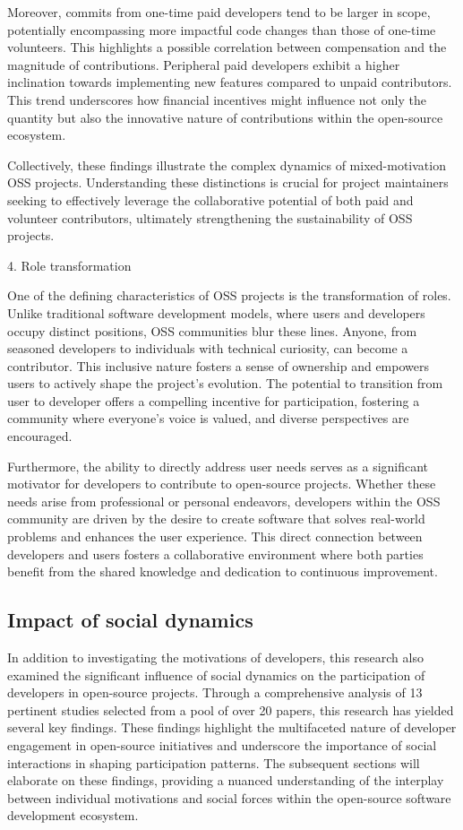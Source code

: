 Moreover, commits from one-time paid developers tend to be larger in scope, potentially encompassing more impactful code changes than those of one-time volunteers. This highlights a possible correlation between compensation and the magnitude of contributions. Peripheral paid developers exhibit a higher inclination towards implementing new features compared to unpaid contributors. This trend underscores how financial incentives might influence not only the quantity but also the innovative nature of contributions within the open-source ecosystem.

Collectively, these findings illustrate the complex dynamics of mixed-motivation OSS projects. Understanding these distinctions is crucial for project maintainers seeking to effectively leverage the collaborative potential of both paid and volunteer contributors, ultimately strengthening the sustainability of OSS projects.

4. Role transformation

One of the defining characteristics of OSS projects is the transformation of roles.  Unlike traditional software development models, where users and developers occupy distinct positions, OSS communities blur these lines.  Anyone, from seasoned developers to individuals with technical curiosity, can become a contributor.  This inclusive nature fosters a sense of ownership and empowers users to actively shape the project's evolution.  The potential to transition from user to developer offers a compelling incentive for participation, fostering a community where everyone's voice is valued, and diverse perspectives are encouraged.

Furthermore, the ability to directly address user needs serves as a significant motivator for developers to contribute to open-source projects.  Whether these needs arise from professional or personal endeavors, developers within the OSS community are driven by the desire to create software that solves real-world problems and enhances the user experience.  This direct connection between developers and users fosters a collaborative environment where both parties benefit from the shared knowledge and dedication to continuous improvement.

\subsection{Impact of social dynamics}

In addition to investigating the motivations of developers, this research also examined the significant influence of social dynamics on the participation of developers in open-source projects. Through a comprehensive analysis of 13 pertinent studies selected from a pool of over 20 papers, this research has yielded several key findings. These findings highlight the multifaceted nature of developer engagement in open-source initiatives and underscore the importance of social interactions in shaping participation patterns. The subsequent sections will elaborate on these findings, providing a nuanced understanding of the interplay between individual motivations and social forces within the open-source software development ecosystem.

